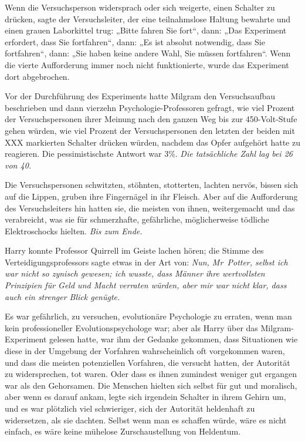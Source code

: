 {Wenn die Versuchsperson widersprach oder sich weigerte, einen Schalter zu drücken, sagte der Versuchsleiter, der eine teilnahmslose Haltung bewahrte und einen grauen Laborkittel trug: „Bitte fahren Sie fort“, dann: „Das Experiment erfordert, dass Sie fortfahren“, dann: „Es ist absolut notwendig, dass Sie fortfahren“, dann: „Sie haben keine andere Wahl, Sie müssen fortfahren“. Wenn die vierte Aufforderung immer noch nicht funktionierte, wurde das Experiment dort abgebrochen.

Vor der Durchführung des Experiments hatte Milgram den Versuchsaufbau beschrieben und dann vierzehn Psychologie-Professoren gefragt, wie viel Prozent der Versuchspersonen ihrer Meinung nach den ganzen Weg bis zur 450-Volt-Stufe gehen würden, wie viel Prozent der Versuchspersonen den letzten der beiden mit XXX markierten Schalter drücken würden, nachdem das Opfer aufgehört hatte zu reagieren. Die pessimistischste Antwort war 3\%. \emph{Die tatsächliche Zahl lag bei 26 von 40.}

Die Versuchspersonen schwitzten, stöhnten, stotterten, lachten nervös, bissen sich auf die Lippen, gruben ihre Fingernägel in ihr Fleisch. Aber auf die Aufforderung des Versuchsleiters hin hatten sie, die meisten von ihnen, weitergemacht und das verabreicht, was sie für schmerzhafte, gefährliche, möglicherweise tödliche Elektroschocks hielten. \emph{Bis zum Ende.}

Harry konnte Professor Quirrell im Geiste lachen hören; die Stimme des Verteidigungsprofessors sagte etwas in der Art von: \emph{Nun, Mr~Potter, selbst ich war nicht so zynisch gewesen; ich wusste, dass Männer ihre wertvollsten Prinzipien für Geld und Macht verraten würden, aber mir war nicht klar, dass auch ein strenger Blick genügte.}

Es war gefährlich, zu versuchen, evolutionäre Psychologie zu erraten, wenn man kein professioneller Evolutionspsychologe war; aber als Harry über das Milgram-Experiment gelesen hatte, war ihm der Gedanke gekommen, dass Situationen wie diese in der Umgebung der Vorfahren wahrscheinlich oft vorgekommen waren, und dass die meisten potenziellen Vorfahren, die versucht hatten, der Autorität zu widersprechen, tot waren. Oder dass es ihnen zumindest weniger gut ergangen war als den Gehorsamen. Die Menschen hielten sich selbst für gut und moralisch, aber wenn es darauf ankam, legte sich irgendein Schalter in ihrem Gehirn um, und es war plötzlich viel schwieriger, sich der Autorität heldenhaft zu widersetzen, als sie dachten. Selbst wenn man es schaffen würde, wäre es nicht einfach, es wäre keine mühelose Zurschaustellung von Heldentum.

}
